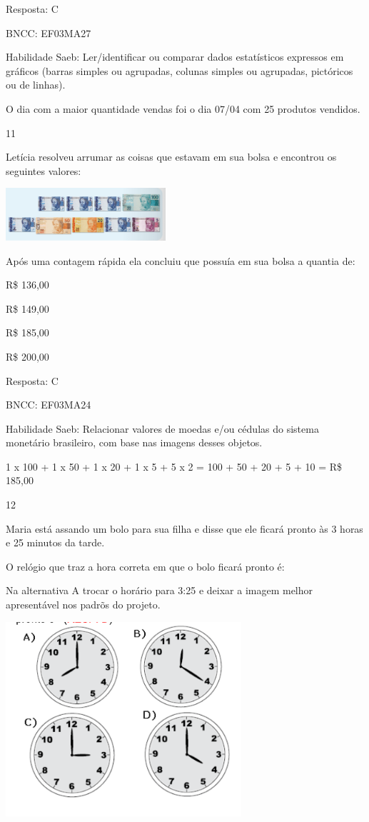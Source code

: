 \begin{escolha}
{\begin{escolha}
{Resposta: C

BNCC: EF03MA27

Habilidade Saeb: Ler/identificar ou comparar dados estatísticos
expressos em gráficos (barras simples ou agrupadas, colunas simples ou
agrupadas, pictóricos ou de linhas).

O dia com a maior quantidade vendas foi o dia 07/04 com 25 produtos
vendidos.

\num{11}

Letícia resolveu arrumar as coisas que estavam em sua bolsa e encontrou
os seguintes valores:

\includegraphics[width=2.33354in,height=0.76673in]{media/image125.png}

Após uma contagem rápida ela concluiu que possuía em sua bolsa a quantia
de:

\begin{escolha}

\item
  R\$ 136,00
\item
  R\$ 149,00
\item
  R\$ 185,00
\item
  R\$ 200,00
\end{escolha}

Resposta: C

BNCC: EF03MA24

Habilidade Saeb: Relacionar valores de moedas e/ou cédulas do sistema
monetário brasileiro, com base nas imagens desses objetos.

1 x 100 + 1 x 50 + 1 x 20 + 1 x 5 + 5 x 2 = 100 + 50 + 20 + 5 + 10 = R\$
185,00

\num{12}

Maria está assando um bolo para sua filha e disse que ele ficará pronto
às 3 horas e 25 minutos da tarde.

O relógio que traz a hora correta em que o bolo ficará pronto é:

Na alternativa A trocar o horário para 3:25 e deixar a imagem melhor
apresentável nos padrõs do projeto.

\includegraphics[width=3.44197in,height=2.84191in]{media/image126.png}

}
\end{escolha}}
\end{escolha}
